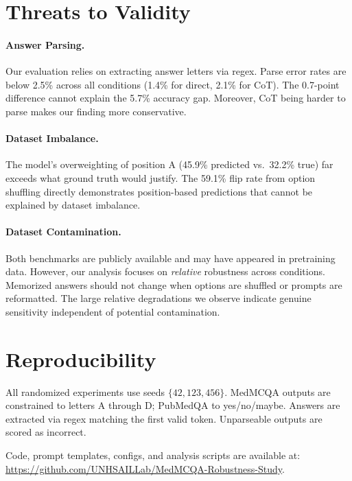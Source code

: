 \documentclass[runningheads,a4paper]{llncs}
\begin{document}
\section{Threats to Validity}\label{app:threats}

\paragraph{Answer Parsing.}
Our evaluation relies on extracting answer letters via regex. Parse error rates are below 2.5\% across all conditions (1.4\% for direct, 2.1\% for CoT). The 0.7-point difference cannot explain the 5.7\% accuracy gap. Moreover, CoT being harder to parse makes our finding more conservative.

\paragraph{Dataset Imbalance.}
The model's overweighting of position A (45.9\% predicted vs.\ 32.2\% true) far exceeds what ground truth would justify. The 59.1\% flip rate from option shuffling directly demonstrates position-based predictions that cannot be explained by dataset imbalance.

\paragraph{Dataset Contamination.}
Both benchmarks are publicly available and may have appeared in pretraining data. However, our analysis focuses on \textit{relative} robustness across conditions. Memorized answers should not change when options are shuffled or prompts are reformatted. The large relative degradations we observe indicate genuine sensitivity independent of potential contamination.

\section{Reproducibility}\label{app:repro}

All randomized experiments use seeds $\{42, 123, 456\}$. MedMCQA outputs are constrained to letters A through D; PubMedQA to yes/no/maybe. Answers are extracted via regex matching the first valid token. Unparseable outputs are scored as incorrect.

Code, prompt templates, configs, and analysis scripts are available at:
\url{https://github.com/UNHSAILLab/MedMCQA-Robustness-Study}.
\end{document}
